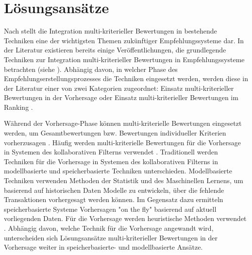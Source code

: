 
\section{Lösungsansätze}
Nach \textcite[S. 853]{adomavicius:4:inbook} stellt die Integration multi-kriteriel\-ler Bewertungen in bestehende Techniken eine der wichtigsten Themen zukünftiger Empfehlungssysteme dar.
In der Literatur existieren bereits einige Veröffentlichungen, die grundlegende Techniken zur Integration multi-kriterieller Bewertungen in Empfehlungssysteme betrachten (siehe \cite{recommenderSystems:2016}\cite{adomavicius:4:inbook}\cite{adomavicius:inproceedings:2}).
Abhängig davon, in welcher Phase des Empfehlungserstellungsprozesses die Techniken eingesetzt werden, werden diese in der Literatur einer von zwei Kategorien zugeordnet: Einsatz multi-kriterieller Bewertungen in der Vorhersage oder Einsatz multi-kriterieller Bewertungen im Ranking \cite[S. 854]{adomavicius:4:inbook}.

Während der Vorhersage-Phase können multi-kriterielle Bewertungen eingesetzt werden, um Gesamtbewertungen bzw. Bewertungen individueller Kriterien vorherzusagen \cite[S. 854]{adomavicius:4:inbook}.
Häufig werden multi-kriterielle Bewertungen für die Vorhersage in Systemen des kollaborativen Filterns verwendet \cite[S. 850]{adomavicius:4:inbook}.
Traditionell werden Techniken für die Vorhersage in Systemen des kollaborativen Filterns in modellbasierte und speicherbasierte Techniken unterschieden.
Modellbasierte Techniken verwenden Methoden der Statistik und des Maschinellen Lernens, um basierend auf historischen Daten Modelle zu entwickeln, über die fehlende Transaktionen vorhergesagt werden können.
Im Gegensatz dazu ermitteln speicherbasierte Systeme Vorhersagen "on the fly" \cite[S. 855]{adomavicius:4:inbook} basierend auf aktuell vorliegenden Daten.
Für die Vorhersage werden heuristische Methoden verwendet \cite[S. 855]{adomavicius:4:inbook}.
Abhängig davon, welche Technik für die Vorhersage angewandt wird, unterscheiden sich Lösungsansätze multi-kriterieller Bewertungen in der Vorhersage weiter in speicherbasierte- und modellbasierte Ansätze.

